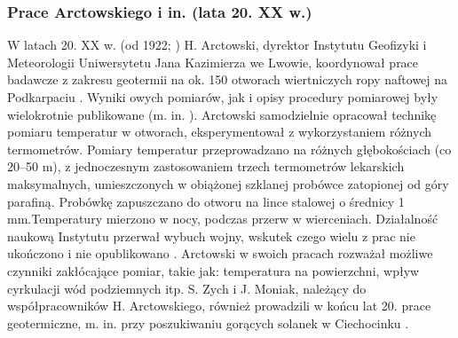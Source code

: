 \documentclass[11.5pt,twoside]{report}
\begin{document}
	
\subsubsection{Prace Arctowskiego i in. (lata 20. XX w.)}

W latach 20. XX w. (od 1922; \cite{Olpinska.1988}) H. Arctowski, dyrektor Instytutu Geofizyki i Meteorologii Uniwersytetu Jana Kazimierza we Lwowie, koordynował prace badawcze z zakresu geotermii na ok. 150 otworach wiertniczych ropy naftowej na Podkarpaciu \parencite{Maj.2010,Olpinska.1988}. Wyniki owych pomiarów, jak i opisy procedury pomiarowej były wielokrotnie publikowane (m. in. \cite{Arctowski.1923c,Arctowski.1923b,Arctowski.1923a}). Arctowski samodzielnie opracował technikę pomiaru temperatur w otworach, eksperymentował z wykorzystaniem różnych termometrów. Pomiary temperatur przeprowadzano na różnych głębokościach (co 20--50 m), z jednoczesnym zastosowaniem trzech termometrów lekarskich maksymalnych, umieszczonych w obiążonej szklanej probówce zatopionej od góry parafiną. Probówkę zapuszczano do otworu na lince stalowej o średnicy 1 mm.Temperatury mierzono w nocy, podczas przerw w wierceniach. Działalność naukową Instytutu przerwał wybuch wojny, wskutek czego wielu z prac nie ukończono i nie opublikowano \parencite{Olpinska.1988}. Arctowski w swoich pracach rozważał możliwe czynniki zakłócające pomiar, takie jak: temperatura na powierzchni, wpływ cyrkulacji wód podziemnych itp. S. Zych i J. Moniak, należący do współpracowników H. Arctowskiego, również prowadzili w końcu lat 20. prace geotermiczne, m. in. przy poszukiwaniu gorących solanek w Ciechocinku \parencite{Maj.2010}.

\end{document}
